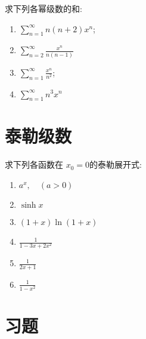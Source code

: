 \begin{problem}
    求下列各幂级数的和:
    \begin{enumerate}
        \item \(\sum_{n=1}^{\infty} n(n + 2) x^n\);
        \item \(\sum_{n=2}^{\infty} \frac{x^n}{n(n - 1)}\)
        \item \(\sum_{n=1}^{\infty} \frac{x^n}{n^2}\);
        \item \(\sum_{n=1}^{\infty} n^{3}x^{n}\)
    \end{enumerate}
\end{problem}
\section{泰勒级数}

\begin{problem}
    求下列各函数在 \(x_0 = 0\)的泰勒展开式:
    \begin{enumerate}
        \item \(a^x, \quad (a > 0)\)
        \item \(\sinh x\)
        \item \((1 + x) \ln(1 + x)\)
        \item \(\frac{1}{1 - 3x + 2x^2}\)
        \item \(\frac{1}{2x+1}\) 
        \item \(\frac{1}{1 - x^2}\) 
    \end{enumerate}
\end{problem}
\section{习题}

